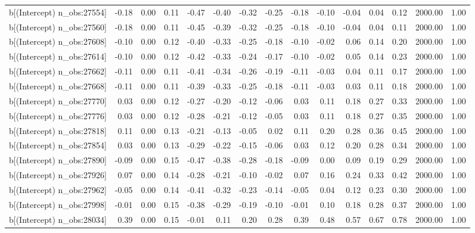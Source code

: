 \begin{table}[ht]
\begin{tabular}{rrrrrrrrrrrrrrr}
  b[(Intercept) n\_obs:27554] & -0.18 & 0.00 & 0.11 & -0.47 & -0.40 & -0.32 & -0.25 & -0.18 & -0.10 & -0.04 & 0.04 & 0.12 & 2000.00 & 1.00 \\ 
  b[(Intercept) n\_obs:27560] & -0.18 & 0.00 & 0.11 & -0.45 & -0.39 & -0.32 & -0.25 & -0.18 & -0.10 & -0.04 & 0.04 & 0.11 & 2000.00 & 1.00 \\ 
  b[(Intercept) n\_obs:27608] & -0.10 & 0.00 & 0.12 & -0.40 & -0.33 & -0.25 & -0.18 & -0.10 & -0.02 & 0.06 & 0.14 & 0.20 & 2000.00 & 1.00 \\ 
  b[(Intercept) n\_obs:27614] & -0.10 & 0.00 & 0.12 & -0.42 & -0.33 & -0.24 & -0.17 & -0.10 & -0.02 & 0.05 & 0.14 & 0.23 & 2000.00 & 1.00 \\ 
  b[(Intercept) n\_obs:27662] & -0.11 & 0.00 & 0.11 & -0.41 & -0.34 & -0.26 & -0.19 & -0.11 & -0.03 & 0.04 & 0.11 & 0.17 & 2000.00 & 1.00 \\ 
  b[(Intercept) n\_obs:27668] & -0.11 & 0.00 & 0.11 & -0.39 & -0.33 & -0.25 & -0.18 & -0.11 & -0.03 & 0.03 & 0.11 & 0.18 & 2000.00 & 1.00 \\ 
  b[(Intercept) n\_obs:27770] & 0.03 & 0.00 & 0.12 & -0.27 & -0.20 & -0.12 & -0.06 & 0.03 & 0.11 & 0.18 & 0.27 & 0.33 & 2000.00 & 1.00 \\ 
  b[(Intercept) n\_obs:27776] & 0.03 & 0.00 & 0.12 & -0.28 & -0.21 & -0.12 & -0.05 & 0.03 & 0.11 & 0.18 & 0.27 & 0.35 & 2000.00 & 1.00 \\ 
  b[(Intercept) n\_obs:27818] & 0.11 & 0.00 & 0.13 & -0.21 & -0.13 & -0.05 & 0.02 & 0.11 & 0.20 & 0.28 & 0.36 & 0.45 & 2000.00 & 1.00 \\ 
  b[(Intercept) n\_obs:27854] & 0.03 & 0.00 & 0.13 & -0.29 & -0.22 & -0.15 & -0.06 & 0.03 & 0.12 & 0.20 & 0.28 & 0.34 & 2000.00 & 1.00 \\ 
  b[(Intercept) n\_obs:27890] & -0.09 & 0.00 & 0.15 & -0.47 & -0.38 & -0.28 & -0.18 & -0.09 & 0.00 & 0.09 & 0.19 & 0.29 & 2000.00 & 1.00 \\ 
  b[(Intercept) n\_obs:27926] & 0.07 & 0.00 & 0.14 & -0.28 & -0.21 & -0.10 & -0.02 & 0.07 & 0.16 & 0.24 & 0.33 & 0.42 & 2000.00 & 1.00 \\ 
  b[(Intercept) n\_obs:27962] & -0.05 & 0.00 & 0.14 & -0.41 & -0.32 & -0.23 & -0.14 & -0.05 & 0.04 & 0.12 & 0.23 & 0.30 & 2000.00 & 1.00 \\ 
  b[(Intercept) n\_obs:27998] & -0.01 & 0.00 & 0.15 & -0.38 & -0.29 & -0.19 & -0.10 & -0.01 & 0.10 & 0.18 & 0.28 & 0.37 & 2000.00 & 1.00 \\ 
  b[(Intercept) n\_obs:28034] & 0.39 & 0.00 & 0.15 & -0.01 & 0.11 & 0.20 & 0.28 & 0.39 & 0.48 & 0.57 & 0.67 & 0.78 & 2000.00 & 1.00 \\ 

\end{tabular}
\end{table}
